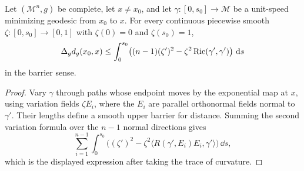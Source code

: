 \begin{lemma}
\label{lem:chow-iii-distance-laplacian-upper-bound}
Let \((\mathcal M^n,g)\) be complete, let \(x\ne x_0\), and let
\(\gamma:[0,s_0]\to\mathcal M\) be a unit-speed minimizing geodesic from
\(x_0\) to \(x\).  For every continuous piecewise smooth
\(\zeta:[0,s_0]\to[0,1]\) with \(\zeta(0)=0\) and \(\zeta(s_0)=1\),
\[
 \Delta_gd_g(x_0,x)\le\int_0^{s_0}
 \bigl((n-1)(\zeta')^2-\zeta^2\operatorname{Ric}(\gamma',\gamma')\bigr)\,\,\mathrm{d} s
\]
in the barrier sense.
\end{lemma}
\begin{proof}
Vary \(\gamma\) through paths whose endpoint moves by the exponential map at
\(x\), using variation fields \(\zeta E_i\), where the \(E_i\) are parallel
orthonormal fields normal to \(\gamma'\).  Their lengths define a smooth upper
barrier for distance.  Summing the second variation formula over the
\(n-1\) normal directions gives
\[
 \sum_{i=1}^{n-1}\int_0^{s_0}
 \bigl((\zeta')^2-\zeta^2\langle R(\gamma',E_i)E_i,\gamma'\rangle\bigr)\,\dd s,
\]
which is the displayed expression after taking the trace of curvature.
\end{proof}

